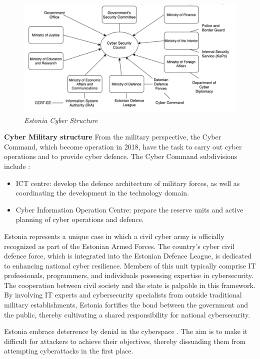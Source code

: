 \begin{figure}[H]
    \centering
    \includegraphics[width=1\textwidth]{Images/estonia.png}
    \caption{\textit{Estonia Cyber Structure}}
    \label{fig:estonia}
\end{figure}

\textbf{Cyber Military structure} From the military perspective, the Cyber Command, which become operation in 2018, have the task to carry out cyber operations and to provide cyber defence. The Cyber Command subdivisions include \autocite{defenceforces_2023_cyber}: 
\begin{itemize}
    \item ICT centre: develop the defence architecture of military forces, as well as coordinating the development in the technology domain. 
    \item Cyber Information Operation Centre: prepare the reserve units and active planning of cyber operations and defence.
\end{itemize}

Estonia represents a unique case in which a civil cyber army is officially recognized as part of the Estonian Armed Forces. The country's cyber civil defence force, which is integrated into the Estonian Defence League, is dedicated to enhancing national cyber resilience. Members of this unit typically comprise IT professionals, programmers, and individuals possessing expertise in cybersecurity. The cooperation between civil society and the state is palpable in this framework. By involving IT experts and cybersecurity specialists from outside traditional military establishments, Estonia fortifies the bond between the government and the public, thereby cultivating a shared responsibility for national cybersecurity.

Estonia embrace deterrence by denial in the cyberspace \autocite{oh_2019_exploring}. The aim is to make it difficult for attackers to achieve their objectives, thereby dissuading them from attempting cyberattacks in the first place. 

